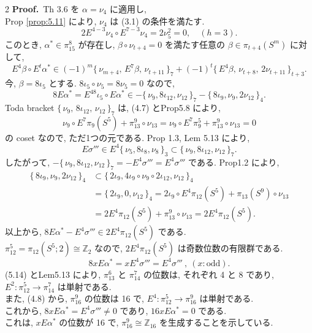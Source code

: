 \documentclass[10pt, leqno]{ltjsarticle}
\newcommand{\todai}[2][]{\{\,#2\,\}_{#1}}      %
\numberwithin{equation}{section}
\theoremstyle{plain}
\theoremstyle{definition}
\theoremstyle{remark}
\begin{document}
\begin{paracol}{2}
\noindent
\textbf{Proof.}\ 
Th 3.6 を \(\alpha=\nu_{4}\) に適用し, \\
Prop \ref{prop:5.11} により, 
\(\nu_4\) は (3.1) の条件を満たす. 
\[
2E^{4-3}\nu_{4}\circ E^{7-3}\nu_{4}=2\nu_{5}^{2}=0,
\quad (h=3).
\]
このとき, 
\(\alpha^{\ast}\in\pi^{8}_{15}\) が存在し, 
\(\beta\circ\nu_{t+4}=0\) を満たす任意の \(\beta\in\pi_{t+4}(S^m)\) に対して, 
\[
E^{4}\beta\circ E^t\alpha^{\ast}
\in (-1)^{m}\todai[7]{\nu_{m+4},\,E^{7}\beta,\,\nu_{t+11}}
+(-1)^{t}\todai[t+3]{E^{4}\beta,\,\nu_{t+8},\,2\nu_{t+11}} .
\]
今, \(\beta=8\iota_{5}\) とする. 
\(8\iota_5\circ\nu_5=8\nu_5=0\) なので, 
\[
8E\alpha^{\ast}=E^48\iota_5\circ E\alpha^{\ast}
\in -\todai[7]{\nu_9,8\iota_{12},\nu_{12}}
-\todai[4]{8\iota_9,\nu_9,2\nu_{12}} .  
\]
Toda bracket \(\todai[7]{\nu_{9},\,8\iota_{12},\,\nu_{12}}\) は, 
(4.7) とProp5.8 により, 
\[
\nu_9\circ E^7\pi_9(S^5) + \pi_{13}^9\circ\nu_{13}
=\nu_9\circ E^7\pi_9^5 + \pi_{13}^9\circ\nu_{13} = 0
\]
の coset なので, ただ1つの元である. 
Prop 1.3, Lem 5.13 により, 
\[
E\sigma'''\in E^4\todai[3]{\nu_5,8\iota_8,\nu_8}
\subset \todai[7]{\nu_9,8\iota_{12},\nu_{12}} .
\]
したがって, \(-\todai[7]{\nu_9,8\iota_{12},\nu_{12}}
=-E^4\sigma'''=E^4\sigma'''\) である. 
Prop1.2 により, 
\begin{align*}
\todai[4]{8\iota_9,\nu_9,2\nu_{12}}
& \subset\todai[4]{2\iota_9,4\iota_9\circ\nu_9\circ2\iota_{12}, \nu_{12}} \\
& =\todai[4]{2\iota_9,0,\nu_{12}}
=2\iota_9\circ E^4\pi_{12}(S^5) + \pi_{13}(S^9)\circ\nu_{13} \\
& =2E^4\pi_{12}(S^5) + \pi_{13}^9\circ\nu_{13}
=2E^4\pi_{12}(S^5) .
\end{align*}
以上から, \(8E\alpha^{\ast} - E^4\sigma''' \in 2E^4\pi_{12}(S^5)\) である. \\
\(\pi_{12}^5=\pi_{12}(S^5;2)\cong\mathbb{Z}_2\) なので, 
\(2E^4\pi_{12}(S^5)\) は奇数位数の有限群である. 
\[
8x E\alpha^{\ast}=xE^{4}\sigma'''=E^4\sigma'''\ , \ (x:\text{odd}) .
\]
(5.14) とLem5.13 により, \(\pi_{13}^6\) と \(\pi_{14}^7\) 
の位数は, それぞれ 4 と 8 であり, \\
\(E^2:\pi_{12}^5\to\pi_{14}^7\) は単射である. \\
また, (4.8) から, \(\pi_{16}^9\) の位数は 16 で, 
\(E^4:\pi_{12}^5\to\pi_{16}^9\) は単射である. \\
これから, \(8xE\alpha^{\ast}=E^4\sigma'''\ne0\) であり, 
\(16xE\alpha^{\ast}=0\) である. \\
これは, \(xE\alpha^{\ast}\) の位数が 16 で, 
\(\pi_{16}^9\cong\mathbb{Z}_{16}\) を生成することを示している. 


\end{paracol}
\end{document}
